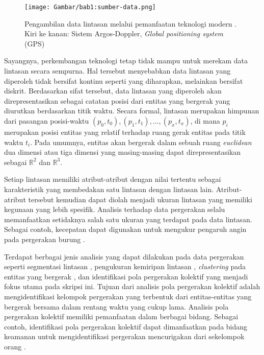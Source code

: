 \begin{figure}[h]
    \centering
    \texttt{[image: Gambar/bab1:sumber-data.png]}
    \caption[Teknologi pengambilan data lintasan]{Pengambilan data lintasan melalui pemanfaatan teknologi modern \cite{carter:argos}. Kiri ke kanan: Sistem Argos-Doppler, \textit{Global positioning system} (GPS)}
    \label{bab1:sumber-data}
\end{figure}



Sayangnya, perkembangan teknologi tetap tidak mampu untuk merekam data lintasan secara sempurna. Hal tersebut menyebabkan data lintasan yang diperoleh tidak bersifat kontinu seperti yang diharapkan, melainkan bersifat diskrit. Berdasarkan sifat tersebut, data lintasan yang diperoleh akan direpresentasikan sebagai catatan posisi dari entitas yang bergerak yang diurutkan berdasarkan titik waktu. Secara formal, lintasan merupakan himpunan dari pasangan posisi-waktu $(p_0, t_0), (p_1, t_1), \ldots, (p_x, t_x)$, di mana $p_i$ merupakan posisi entitas yang relatif terhadap ruang gerak entitas pada titik waktu $t_i$. Pada umumnya, entitas akan bergerak dalam sebuah ruang \textit{euclidean} dua dimensi atau tiga dimensi yang masing-masing dapat direpresentasikan sebagai 
$\mathbb{R}^2$ dan $\mathbb{R}^3$. \iffalse \lionov{disebut di sini bahwa ruang gerak biasanya R2 atau R3}. \fi

Setiap lintasan memiliki atribut-atribut dengan nilai tertentu sebagai karakteristik yang membedakan satu lintasan dengan lintasan lain. Atribut-atribut tersebut kemudian dapat diolah menjadi ukuran lintasan yang memiliki kegunaan yang lebih spesifik. Analisis terhadap data pergerakan selalu memanfaatkan setidaknya salah satu ukuran yang terdapat pada data lintasan. Sebagai contoh, kecepatan dapat digunakan untuk mengukur pengaruh angin pada pergerakan burung \cite{safi:speed}.

\iffalse \lionov{jadiin paragraf baru, kan ini beda topik} \fi

Terdapat berbagai jenis analisis yang dapat dilakukan pada data pergerakan seperti segmentasi lintasan \cite{mann:01:segmentation}, pengukuran kemiripan lintasan \cite{rote:01:hausdorff, alt:01:frechet, muller:dtw}, \textit{clustering} pada entitas yang bergerak \cite{lee:01:clustering}, dan identifikasi pola pergerakan kolektif yang menjadi fokus utama pada skripsi ini. Tujuan dari analisis pola pergerakan kolektif adalah mengidentifikasi kelompok pergerakan yang terbentuk dari entitas-entitas yang bergerak bersama dalam rentang waktu yang cukup lama. Analisis pola pergerakan kolektif memiliki pemanfaatan dalam berbagai bidang. Sebagai contoh, identifikasi pola pergerakan kolektif dapat dimanfaatkan pada bidang keamanan untuk mengidentifikasi pergerakan mencurigakan dari sekelompok orang \cite{makris:01:security}.

